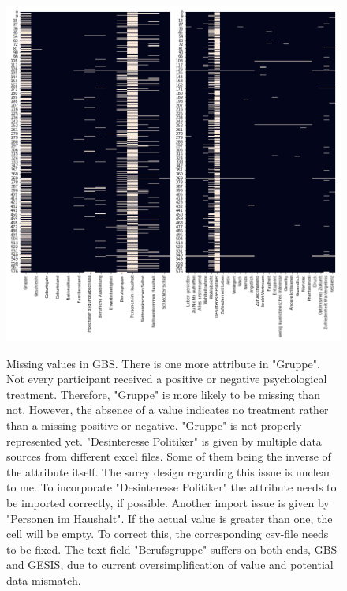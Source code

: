 \begin{figure}[ht]
	\begin{center}
		\captionsetup{width= 400pt}
		\includegraphics[scale=0.50,angle=0]{fig/gbs_missing}
		\label{gbs_miss}
		\caption{Missing values in GBS. There is one more attribute in "Gruppe". Not every participant received a positive or negative psychological treatment. Therefore, "Gruppe" is more likely to be missing than not. However, the absence of a value indicates no treatment rather than a missing positive or negative. "Gruppe" is not properly represented yet. "Desinteresse Politiker" is given by multiple data sources from different excel files. Some of them being the inverse of the attribute itself. The surey design regarding this issue is unclear to me. To incorporate "Desinteresse Politiker" the attribute needs to be imported correctly, if possible. Another import issue is given by "Personen im Haushalt". If the actual value is greater than one, the cell will be empty. To correct this, the corresponding csv-file needs to be fixed. The text field "Berufsgruppe" suffers on both ends, GBS and GESIS, due to current oversimplification of value and potential data mismatch.}
	\end{center}
\end{figure}

